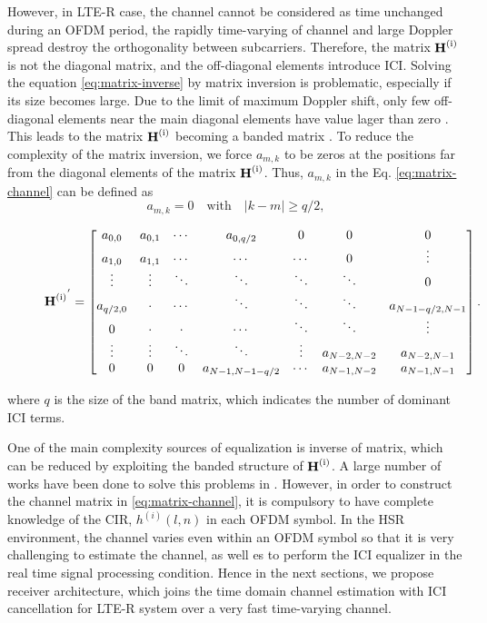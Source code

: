 \documentclass[12pt,journal,draftclsnofoot,onecolumn]{IEEEtran}
\begin{document}
However, in LTE-R case, the channel cannot be considered as time  unchanged during an OFDM period, the rapidly time-varying of channel and large Doppler spread destroy the orthogonality between subcarriers. Therefore, the matrix $\rm{\textbf H^{(i)}}$ is not the diagonal matrix, and the off-diagonal elements introduce ICI. Solving  the equation \eqref{eq:matrix-inverse} by matrix inversion is problematic, especially if its size becomes large. Due to the limit of maximum Doppler shift, only few off-diagonal elements near the main diagonal elements have value lager than zero \cite{Jeon1999}. This leads to the matrix $\rm{\textbf H^{(i)}}$ becoming a banded matrix \cite{Cai2003}. To reduce the complexity of the matrix inversion, we force $a_{m,k}$ to be zeros at the positions far from the diagonal elements of the matrix $\rm{\textbf H^{(i)}}$. Thus,  $a_{m,k}$ in the Eq. \eqref{eq:matrix-channel} can be defined as
%
\begin{equation}
a_{m,k}=0\quad  \text{with}\quad  |k-m|\geqslant q/2,
\end{equation}
%
\begin{figure}[t]
\begin{equation}\label{eq:banded matrix}
\begin{aligned}
		\rm {\textbf H^{(i)}}^{'} = \begin{bmatrix} 
		a_{0,0} & a_{0,1}& \cdots & a_{0,q/2} & 0 & 0 &0
		\\ a_{1,0} & a_{1,1} & \cdots & \cdots &\cdots& 0 & \vdots
		\\ \vdots & \vdots & \ddots & \ddots &\ddots & \ddots &0
		\\ a_{q/2,0} & \cdot & \cdots & \ddots & \ddots & \ddots & a_{N - 1 - q/2,N - 1}
		\\0&\cdot& \cdot& \cdots &\ddots& \ddots &\vdots
		\\ \vdots & \vdots & \ddots & \ddots & \vdots & a_{N - 2,N - 2}  & a_{N - 2,N - 1}
		\\0 &0&0 & a_{N - 1,N -1- q/2}& \cdots & a_{N - 1,N - 2}&a_{N - 1,N - 1}\end{bmatrix}.
	\end{aligned}
	\end{equation}
\end{figure}
where $q$ is the size of the band matrix, which indicates the number of dominant ICI terms. 
	
One of the main complexity sources of equalization is inverse of matrix, which can be reduced by exploiting  the banded structure of $\rm{\textbf H^{(i)}}$. A large number of works have been done to solve this problems in \cite{Hsu2009, Liu2012, Schniter2004, Fang2007}. However, in order to construct the channel matrix in \eqref{eq:matrix-channel}, it is compulsory to have complete knowledge of the CIR, $h^{(i)}(l,n)$ in each OFDM symbol. In the HSR environment, the channel varies even within an OFDM symbol so that it is very challenging to estimate the channel, as well es to perform the ICI equalizer in the real time signal processing condition. Hence in the next sections, we propose receiver architecture, which joins the  time domain channel estimation with ICI cancellation for LTE-R system over a very fast time-varying channel.
	
\end{document}
